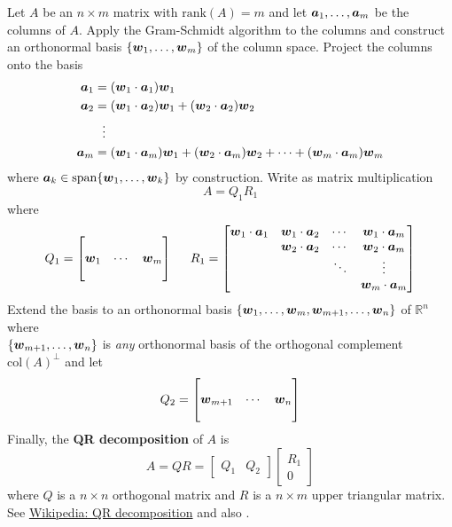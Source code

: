 \begin{definition}
Let $A$ be an $n \times m$ matrix with $\mathrm{rank}(A) = m$ and let $\boldsymbol{a}_1,\dots,\boldsymbol{a}_m$ be the columns of $A$. Apply the Gram-Schmidt algorithm to the columns and construct an orthonormal basis $\{ \boldsymbol{w}_1,\dots,\boldsymbol{w}_m \}$ of the column space. Project the columns onto the basis
\begin{align*}
\boldsymbol{a}_1 &= (\boldsymbol{w}_1 \cdot \boldsymbol{a}_1) \boldsymbol{w}_1 \\
\boldsymbol{a}_2 &= (\boldsymbol{w}_1 \cdot \boldsymbol{a}_2) \boldsymbol{w}_1 + (\boldsymbol{w}_2 \cdot \boldsymbol{a}_2) \boldsymbol{w}_2 \\
& \ \ \vdots \\
\boldsymbol{a}_m &= (\boldsymbol{w}_1 \cdot \boldsymbol{a}_m) \boldsymbol{w}_1 + (\boldsymbol{w}_2 \cdot \boldsymbol{a}_m) \boldsymbol{w}_2 + \cdots + (\boldsymbol{w}_m \cdot \boldsymbol{a}_m) \boldsymbol{w}_m
\end{align*}
where $\boldsymbol{a}_k \in \mathrm{span} \{ \boldsymbol{w}_1 , \dots , \boldsymbol{w}_k \}$ by construction. Write as matrix multiplication
$$
A = Q_1R_1
$$
where
$$
Q_1 = \begin{bmatrix} & & \\ \boldsymbol{w}_1 & \cdots & \boldsymbol{w}_m \\ & & \end{bmatrix}
\hspace{5mm}
R_1 = \begin{bmatrix}
\boldsymbol{w}_1 \cdot \boldsymbol{a}_1 & \boldsymbol{w}_1 \cdot \boldsymbol{a}_2 & \cdots & \boldsymbol{w}_1 \cdot \boldsymbol{a}_m \\
& \boldsymbol{w}_2 \cdot \boldsymbol{a}_2 & \cdots & \boldsymbol{w}_2 \cdot \boldsymbol{a}_m \\
& & \ddots & \vdots \\
& & & \boldsymbol{w}_m \cdot \boldsymbol{a}_m
\end{bmatrix}
$$
Extend the basis to an orthonormal basis $\{ \boldsymbol{w}_1 , \dots , \boldsymbol{w}_m , \boldsymbol{w}_{m+1} , \dots , \boldsymbol{w}_n \}$ of $\mathbb{R}^n$ where \\ $\{ \boldsymbol{w}_{m+1} , \dots , \boldsymbol{w}_n \}$ is {\it any} orthonormal basis of the orthogonal complement $\mathrm{col}(A)^{\perp}$ and let
$$
Q_2 = \begin{bmatrix} & & \\ \boldsymbol{w}_{m+1} & \cdots & \boldsymbol{w}_n \\ & & \end{bmatrix}
$$
Finally, the {\bf QR decomposition} of $A$ is
$$
A = QR =
\begin{bmatrix} Q_1 & Q_2 \end{bmatrix}
\begin{bmatrix} R_1 \\ 0 \end{bmatrix}
$$
where $Q$ is a $n \times n$ orthogonal matrix and $R$ is a $n \times m$ upper triangular matrix. See \href{https://en.wikipedia.org/wiki/QR_decomposition}{Wikipedia: QR decomposition} and also \cite[p.437]{KN}.
\end{definition}

